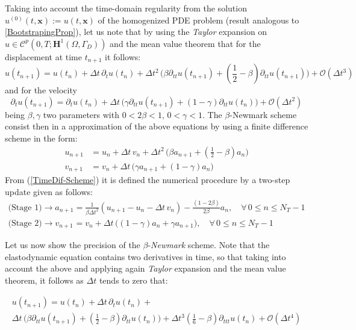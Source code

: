 Taking into account the time-domain regularity from the solution $u^{(0)}(t, \mathbf{x}) := u(t,\mathbf{x})$ of the homogenized PDE problem (result analogous to \ref{BootstrapingProp}), let us note that by using the \textit{Taylor} expansion on $u \in \mathcal{C}^{p}(0,T;\mathbf{H}^1(\Omega, \Gamma_D))$ and the mean value theorem that for the displacement at time $t_{n+1}$ it follows:
\begin{equation*}
    u(t_{n+1}) = u(t_n) + \Delta t \, \partial_{t} u(t_n) + \Delta t^2 \, \big( \beta \partial_{tt} u(t_{n+1}) + (\frac{1}{2} - \beta) \partial_{tt} u(t_{n+1}) \big) + \mathcal{O}(\Delta t^3)    
\end{equation*}
and for the velocity
\begin{equation*}
    \partial_{t} u(t_{n+1}) = \partial_{t} u (t_{n}) + \Delta t \, \big( \gamma \partial_{tt} u(t_{n+1}) + (1-\gamma) \partial_{tt} u(t_n) \big) + \mathcal{O}(\Delta t^2)
\end{equation*}
being $\beta, \gamma$ two parameters with $0 < 2\beta<1,\, 0 < \gamma < 1$.
The $\beta$-Newmark scheme consist then in a approximation of the above equations by using a finite difference scheme in the form:
\begin{align}
    \label{TimeDif-Scheme}
    u_{n+1} &= u_{n} + \Delta t\, v_{n} + \Delta t^2 \, \big( \beta a_{n+1} + (\frac{1}{2} - \beta) a_n \big) \\
    v_{n+1} &= v_n + \Delta t\, \big( \gamma a_{n+1} + (1-\gamma) a_{n} \big)
\end{align}
From (\ref{TimeDif-Scheme}) it is defined the numerical procedure by a two-step update given as follows:
\begin{align}
    \label{TwoStage-Update}
    \text{(Stage 1)}\longrightarrow  a_{n+1} &= \frac{1}{\beta \Delta t^2} ( u_{n+1}-u_n - \Delta t \, v_n) - \frac{(1-2\beta)}{2 \beta} a_n, \quad \forall \, 0 \leq n \leq N_T-1 \\
    \text{(Stage 2)}\longrightarrow v_{n+1} &= v_n + \Delta t \, \big( (1-\gamma) a_n + \gamma a_{n+1} \big), \quad \forall \, 0 \leq n \leq N_T-1
\end{align}

Let us now show the precision of the $\beta$-\textit{Newmark} scheme. Note that the elastodynamic equation contains two derivatives in time, so that taking into account the above and applying again \textit{Taylor} expansion and the mean value theorem, it follows as $\Delta t$ tends to zero that:

\begin{multline}
    u(t_{n+1}) = u(t_{n}) + \Delta t \, \partial_{t} u(t_n) + \\
    \Delta t \, \big( \beta \partial_{tt} u(t_{n+1}) + (\frac{1}{2}- \beta) \partial_{tt} u(t_n) \big) + \Delta t^3 (\frac{1}{6}-\beta) \partial_{ttt}u(t_n) + \mathcal{O}(\Delta t^4)
\end{multline}

